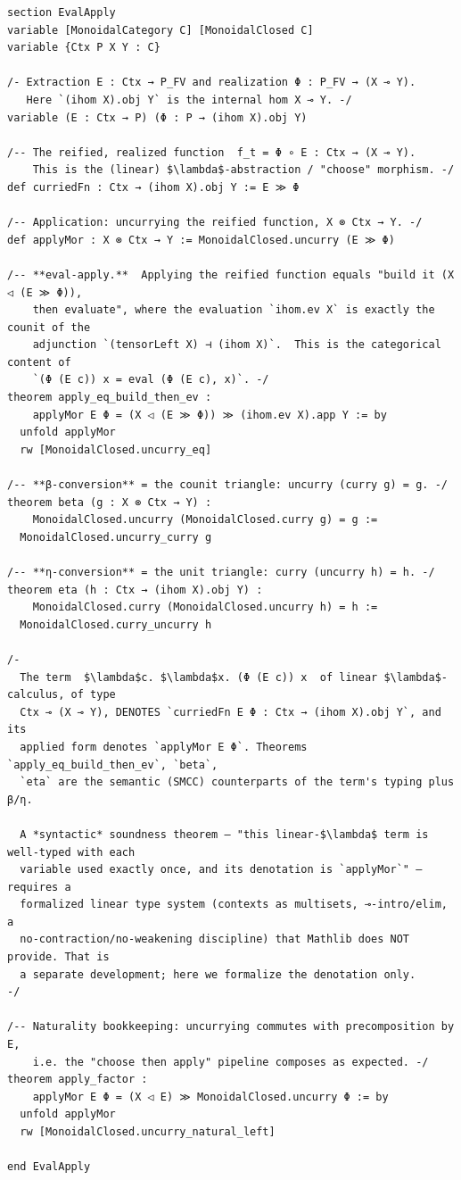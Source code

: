 \documentclass[a4paper,11pt]{article}
\begin{document}
\begin{lstlisting}
section EvalApply
variable [MonoidalCategory C] [MonoidalClosed C]
variable {Ctx P X Y : C}

/- Extraction E : Ctx → P_FV and realization Φ : P_FV → (X ⊸ Y).
   Here `(ihom X).obj Y` is the internal hom X ⊸ Y. -/
variable (E : Ctx → P) (Φ : P → (ihom X).obj Y)

/-- The reified, realized function  f_t = Φ ∘ E : Ctx → (X ⊸ Y).
    This is the (linear) $\lambda$-abstraction / "choose" morphism. -/
def curriedFn : Ctx → (ihom X).obj Y := E ≫ Φ

/-- Application: uncurrying the reified function, X ⊗ Ctx → Y. -/
def applyMor : X ⊗ Ctx → Y := MonoidalClosed.uncurry (E ≫ Φ)

/-- **eval-apply.**  Applying the reified function equals "build it (X ◁ (E ≫ Φ)),
    then evaluate", where the evaluation `ihom.ev X` is exactly the counit of the
    adjunction `(tensorLeft X) ⊣ (ihom X)`.  This is the categorical content of
    `(Φ (E c)) x = eval (Φ (E c), x)`. -/
theorem apply_eq_build_then_ev :
    applyMor E Φ = (X ◁ (E ≫ Φ)) ≫ (ihom.ev X).app Y := by
  unfold applyMor
  rw [MonoidalClosed.uncurry_eq]

/-- **β-conversion** = the counit triangle: uncurry (curry g) = g. -/
theorem beta (g : X ⊗ Ctx → Y) :
    MonoidalClosed.uncurry (MonoidalClosed.curry g) = g :=
  MonoidalClosed.uncurry_curry g

/-- **η-conversion** = the unit triangle: curry (uncurry h) = h. -/
theorem eta (h : Ctx → (ihom X).obj Y) :
    MonoidalClosed.curry (MonoidalClosed.uncurry h) = h :=
  MonoidalClosed.curry_uncurry h

/-
  The term  $\lambda$c. $\lambda$x. (Φ (E c)) x  of linear $\lambda$-calculus, of type
  Ctx ⊸ (X ⊸ Y), DENOTES `curriedFn E Φ : Ctx → (ihom X).obj Y`, and its
  applied form denotes `applyMor E Φ`. Theorems `apply_eq_build_then_ev`, `beta`,
  `eta` are the semantic (SMCC) counterparts of the term's typing plus β/η.

  A *syntactic* soundness theorem — "this linear-$\lambda$ term is well-typed with each
  variable used exactly once, and its denotation is `applyMor`" — requires a
  formalized linear type system (contexts as multisets, ⊸-intro/elim, a
  no-contraction/no-weakening discipline) that Mathlib does NOT provide. That is
  a separate development; here we formalize the denotation only.
-/

/-- Naturality bookkeeping: uncurrying commutes with precomposition by E,
    i.e. the "choose then apply" pipeline composes as expected. -/
theorem apply_factor :
    applyMor E Φ = (X ◁ E) ≫ MonoidalClosed.uncurry Φ := by
  unfold applyMor
  rw [MonoidalClosed.uncurry_natural_left]

end EvalApply
\end{lstlisting}
\end{document}
